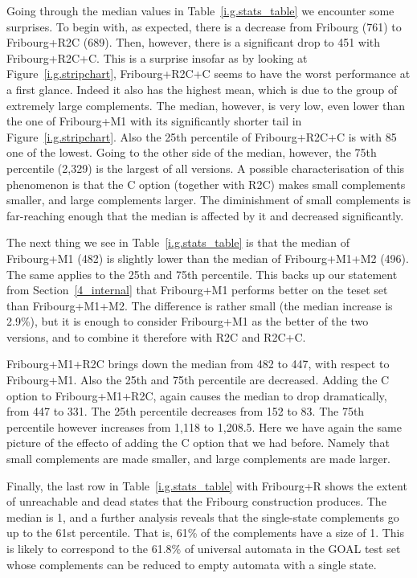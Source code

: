 Going through the median values in Table~\ref{i.g.stats_table} we encounter some surprises. To begin with, as expected, there is a decrease from Fribourg (761) to Fribourg+R2C (689). Then, however, there is a significant drop to 451 with Fribourg+R2C+C. This is a surprise insofar as by looking at Figure~\ref{i.g.stripchart}, Fribourg+R2C+C seems to have the worst performance at a first glance. Indeed it also has the highest mean, which is due to the group of extremely large complements. The median, however, is very low, even lower than the one of Fribourg+M1 with its significantly shorter tail in Figure~\ref{i.g.stripchart}. Also the 25th percentile of Fribourg+R2C+C is with 85 one of the lowest. Going to the other side of the median, however, the 75th percentile (2,329) is the largest of all versions. A possible characterisation of this phenomenon is that the C option (together with R2C) makes small complements smaller, and large complements larger. The diminishment of small complements is far-reaching enough that the median is affected by it and decreased significantly.

The next thing we see in Table~\ref{i.g.stats_table} is that the median of Fribourg+M1 (482) is slightly lower than the median of Fribourg+M1+M2 (496). The same applies to the 25th and 75th percentile. This backs up our statement from Section~\ref{4_internal} that Fribourg+M1 performs better on the \goal{} teset set than Fribourg+M1+M2. The difference is rather small (the median increase is 2.9\%), but it is enough to consider Fribourg+M1 as the better of the two versions, and to combine it therefore with R2C and R2C+C.

Fribourg+M1+R2C brings down the median from 482 to 447, with respect to Fribourg+M1. Also the 25th and 75th percentile are decreased. Adding the C option to Fribourg+M1+R2C, again causes the median to drop dramatically, from 447 to 331. The 25th percentile decreases from 152 to 83. The 75th percentile however increases from 1,118 to 1,208.5. Here we have again the same picture of the effecto of adding the C option that we had before. Namely that small complements are made smaller, and large complements are made larger.

Finally, the last row in Table~\ref{i.g.stats_table} with Fribourg+R shows the extent of unreachable and dead states that the Fribourg construction produces. The median is 1, and a further analysis reveals that the single-state complements go up to the 61st percentile. That is, 61\% of the complements have a size of 1. This is likely to correspond to the 61.8\% of universal automata in the GOAL test set whose complements can be reduced to empty automata with a single state.


